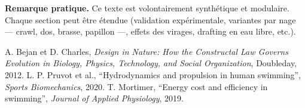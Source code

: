 \documentclass[12pt,a4paper]{article}
\begin{document}
\bigskip
\noindent\textbf{Remarque pratique.} Ce texte est volontairement synthétique et modulaire. Chaque section peut être étendue (validation expérimentale, variantes par nage — crawl, dos, brasse, papillon —, effets des virages, drafting en eau libre, etc.).

\begin{thebibliography}{9}
 A. Bejan et D. Charles, \emph{Design in Nature: How the Constructal Law Governs Evolution in Biology, Physics, Technology, and Social Organization}, Doubleday, 2012.
 L. P. Pruvot et al., ``Hydrodynamics and propulsion in human swimming'', \emph{Sports Biomechanics}, 2020.
 T. Mortimer, ``Energy cost and efficiency in swimming'', \emph{Journal of Applied Physiology}, 2019.
\end{thebibliography}
\end{document}
